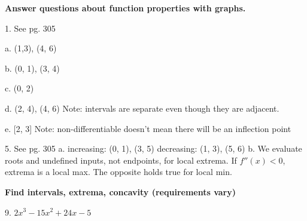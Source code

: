 \documentclass{article}
\begin{document}
\begin{description} %
  \setlength\itemsep{5em}

  \item\textbf{Answer questions about function properties with graphs.}

        \begin{description} %
          \setlength\itemsep{3em}

          \item 1. See pg. 305

                a. (1,3), (4, 6)

                b. (0, 1), (3, 4)

                c. (0, 2)

                d. (2, 4), (4, 6) \space Note: intervals are separate even though they are adjacent.

                e. [2, 3] \space Note: non-differentiable doesn't mean there will be an inflection point
          \item 5. See pg. 305
                a. increasing: (0, 1), (3, 5) decreasing: (1, 3), (5, 6)
                b. We evaluate roots and undefined inputs, not endpoints, for local extrema. If $f''(x) < 0$, extrema is a local max. The opposite holds true for local min.

        \end{description}
  \item\textbf{Find intervals, extrema, concavity (requirements vary)}
        \begin{description}
          \setlength\itemsep{3em}
          \item 9. $2x^3 - 15x^2 + 24x - 5$


\end{description}
\end{description}
\end{document}
